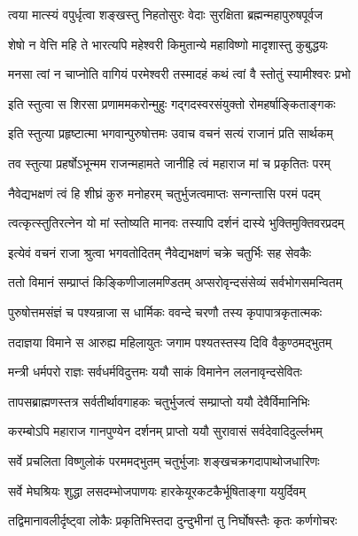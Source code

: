 \twolineshloka
{त्वया मात्स्यं वपुर्धृत्वा शङ्खस्तु निहतोसुरः}
{वेदाः सुरक्षिता ब्रह्मन्महापुरुषपूर्वज}%

\twolineshloka
{शेषो न वेत्ति महि ते भारत्यपि महेश्वरी}
{किमुतान्ये महाविष्णो मादृशास्तु कुबुद्धयः}%

\twolineshloka
{मनसा त्वां न चाप्नोति वागियं परमेश्वरी}
{तस्मादहं कथं त्वां वै स्तोतुं स्यामीश्वरः प्रभो}%

\twolineshloka
{इति स्तुत्वा स शिरसा प्रणाममकरोन्मुहुः}
{गद्गदस्वरसंयुक्तो रोमहर्षाङ्किताङ्गकः}%

\twolineshloka
{इति स्तुत्या प्रहृष्टात्मा भगवान्पुरुषोत्तमः}
{उवाच वचनं सत्यं राजानं प्रति सार्थकम्}%


\twolineshloka
{तव स्तुत्या प्रहर्षोऽभून्मम राजन्महामते}
{जानीहि त्वं महाराज मां च प्रकृतितः परम्}%

\twolineshloka
{नैवेद्यभक्षणं त्वं हि शीघ्रं कुरु मनोहरम्}
{चतुर्भुजत्वमाप्तः सन्गन्तासि परमं पदम्}%

\twolineshloka
{त्वत्कृत्स्तुतिरत्नेन यो मां स्तोष्यति मानवः}
{तस्यापि दर्शनं दास्ये भुक्तिमुक्तिवरप्रदम्}%

\twolineshloka
{इत्येवं वचनं राजा श्रुत्वा भगवतोदितम्}
{नैवेद्यभक्षणं चक्रे चतुर्भिः सह सेवकैः}%

\twolineshloka
{ततो विमानं सम्प्राप्तं किङ्किणीजालमण्डितम्}
{अप्सरोवृन्दसंसेव्यं सर्वभोगसमन्वितम्}%

\twolineshloka
{पुरुषोत्तमसंज्ञं च पश्यन्राजा स धार्मिकः}
{ववन्दे चरणौ तस्य कृपापात्रकृतात्मकः}%

\twolineshloka
{तदाज्ञया विमाने स आरुह्य महिलायुतः}
{जगाम पश्यतस्तस्य दिवि वैकुण्ठमद्भुतम्}%

\twolineshloka
{मन्त्री धर्मपरो राज्ञः सर्वधर्मविदुत्तमः}
{ययौ साकं विमानेन ललनावृन्दसेवितः}%

\twolineshloka
{तापसब्राह्मणस्तत्र सर्वतीर्थावगाहकः}
{चतुर्भुजत्वं सम्प्राप्तो ययौ देवैर्विमानिभिः}%

\twolineshloka
{करम्बोऽपि महाराज गानपुण्येन दर्शनम्}
{प्राप्तो ययौ सुरावासं सर्वदेवादिदुर्ल्लभम्}%

\twolineshloka
{सर्वे प्रचलिता विष्णुलोकं परममद्भुतम्}
{चतुर्भुजाः शङ्खचक्रगदापाथोजधारिणः}%

\twolineshloka
{सर्वे मेघश्रियः शुद्धा लसदम्भोजपाणयः}
{हारकेयूरकटकैर्भूषिताङ्गा ययुर्दिवम्}%

\twolineshloka
{तद्विमानावलीर्दृष्ट्वा लोकैः प्रकृतिभिस्तदा}
{दुन्दुभीनां तु निर्घोषस्तैः कृतः कर्णगोचरः}%


